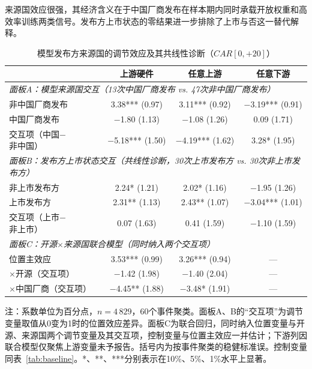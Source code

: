 \documentclass[11pt,fontset=fandol,a4paper]{ctexart}
\newcommand{\changed}[1]{{\color{orange!85!black}#1}}
\begin{document}
\changed{来源国效应很强，其经济含义在于中国厂商发布在样本期内同时承载开放权重和高效率训练两类信号。发布方上市状态的零结果进一步排除了上市与否这一替代解释。}

\begin{table}[H]
\centering
\small
\begin{threeparttable}
\caption{模型发布方来源国的调节效应及其共线性诊断（$CAR[0,+20]$）}
\label{tab:het_origin}
\begin{tabular}{lccc}
\toprule
 & 上游硬件 & 任意上游 & 任意下游 \\
\midrule
\multicolumn{4}{l}{\textit{面板A：模型来源国交互（13次中国厂商发布 vs. 47次非中国厂商发布）}} \\
非中国厂商发布 & 3.38*** (0.97) & 3.11*** (0.92) & $-$3.19*** (0.91) \\
中国厂商发布 & $-$1.80 (1.13) & $-$1.08 (1.26) & 0.09 (1.71) \\
交互项（中国$-$非中国） & $-$5.18*** (1.50) & $-$4.19*** (1.62) & 3.28* (1.95) \\[4pt]
\multicolumn{4}{l}{\textit{面板B：发布方上市状态交互（共线性诊断，30次上市发布方 vs. 30次非上市发布方）}} \\
非上市发布方 & 2.24* (1.21) & 2.02* (1.16) & $-$1.95 (1.26) \\
上市发布方 & 2.31** (1.13) & 2.43** (1.07) & $-$3.04*** (1.01) \\
交互项（上市$-$非上市） & 0.07 (1.63) & 0.41 (1.59) & $-$1.10 (1.59) \\[4pt]
\multicolumn{4}{l}{\textit{面板C：开源$\times$来源国联合模型（同时纳入两个交互项）}} \\
位置主效应 & 3.53*** (0.99) & 3.26*** (0.94) & --- \\
$\times$开源（交互项） & $-$1.42 (1.98) & $-$1.40 (2.04) & --- \\
$\times$中国厂商（交互项） & $-$4.45** (1.88) & $-$3.48* (1.91) & --- \\
\bottomrule
\end{tabular}
\begin{tablenotes}
\footnotesize
\item \changed{注：系数单位为百分点，$n=4\,829$，60个事件聚类。面板A、B的“交互项”为调节变量取值从0变为1时的位置效应差异。面板C为联合回归，同时纳入位置变量与开源、来源国两个调节变量及其交互项，控制变量与位置主效应一并估计；下游列因联合模型仅聚焦上游变量未予报告。括号内为按事件聚类的稳健标准误。控制变量同表~\ref{tab:baseline}。*、**、***分别表示在10\%、5\%、1\%水平上显著。}
\end{tablenotes}
\end{threeparttable}
\end{table}
\end{document}
